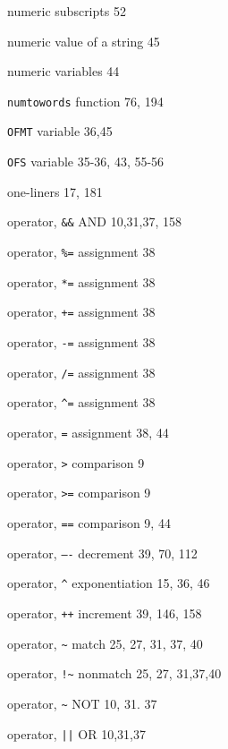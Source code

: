\begin{multicols}{3}
\hangindent=3pc  numeric subscripts 52

\hangindent=3pc  numeric value of a string 45

\hangindent=3pc  numeric variables 44

\hangindent=3pc  \verb'numtowords' function 76, 194

\hangindent=3pc  \verb'OFMT' variable 36,45

\hangindent=3pc  \verb'OFS' variable 35-36, 43, 55-56

\hangindent=3pc  one-liners 17, 181

\hangindent=3pc  operator, \verb'&&' AND 10,31,37, 158

\hangindent=3pc  operator, \verb'%=' assignment 38

\hangindent=3pc  operator, \verb'*=' assignment 38

\hangindent=3pc  operator, \verb'+=' assignment 38

\hangindent=3pc  operator, \verb'-=' assignment 38

\hangindent=3pc  operator, \verb'/=' assignment 38

\hangindent=3pc  operator, \verb'^=' assignment 38

\hangindent=3pc  operator, \verb'=' assignment 38, 44

\hangindent=3pc  operator, \verb'>' comparison 9

\hangindent=3pc  operator, \verb'>=' comparison 9

\hangindent=3pc  operator, \verb'==' comparison 9, 44

\hangindent=3pc  operator, \verb'—-' decrement 39, 70, 112

\hangindent=3pc  operator, \verb'^' exponentiation 15, 36, 46

\hangindent=3pc  operator, \verb'++' increment 39, 146, 158

\hangindent=3pc  operator, \verb'~' match 25, 27, 31, 37, 40

\hangindent=3pc  operator, \verb'!~' nonmatch 25, 27, 31,37,40

\hangindent=3pc  operator, \verb'~' NOT 10, 31. 37

\hangindent=3pc  operator, \verb'||' OR 10,31,37


\end{multicols}
